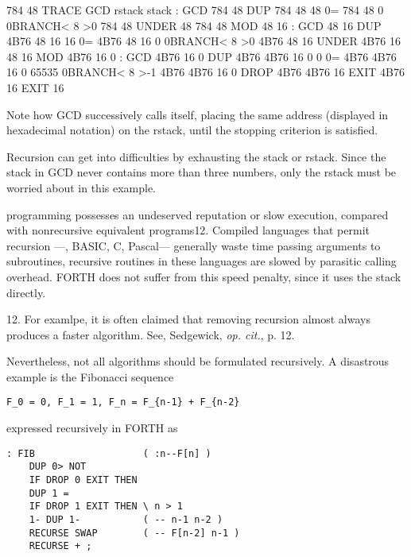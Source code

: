 784 48 TRACE GCD
                            rstack      stack
: GCD                                   784 48
    DUP                                 784 48  48
    0=                                  784 48   0
    0BRANCH< 8 >0                       784 48
    UNDER                               48  784 48
    MOD                                 48  16
    : GCD                               48  16
      DUP                   4B76        48  16  16
      0=                    4B76        48  16   0
      0BRANCH< 8 >0         4B76        48  16
      UNDER                 4B76        16  48  16
        MOD                 4B76        16   0
        : GCD               4B76        16   0
          DUP               4B76 4B76   16   0   0
          0=                4B76 4B76   16   0  65535
          0BRANCH< 8 >-1    4B76 4B76   16   0
          DROP              4B76 4B76   16
        EXIT                4B76        16
    EXIT                                16

Note how GCD successively calls itself, placing the same address (displayed in hexadecimal notation) on the rstack, until the stopping criterion is satisfied.

Recursion can get into difficulties by exhausting the stack or rstack. Since the stack in GCD never contains more than three numbers, only the rstack must be worried about in this example.

 programming possesses an undeserved reputation or slow execution, compared with nonrecursive equivalent programs12. Compiled languages that permit recursion —\eg, BASIC, C, Pascal— generally waste time passing arguments to subroutines, \ie recursive routines in these languages are slowed by parasitic calling overhead. FORTH does not suffer from this speed penalty, since it uses the stack directly.

12. For examlpe, it is often claimed that removing recursion almost always produces a faster algorithm. See, \eg Sedgewick, \textit{op. cit.}, p. 12.

Nevertheless, not all algorithms should be formulated recursively. A disastrous example is the Fibonacci sequence

\begin{lstlisting}
F_0 = 0, F_1 = 1, F_n = F_{n-1} + F_{n-2}
\end{lstlisting}

expressed recursively in FORTH as
\begin{lstlisting}
: FIB                   ( :n--F[n] )
    DUP 0> NOT
    IF DROP 0 EXIT THEN
    DUP 1 = 
    IF DROP 1 EXIT THEN \ n > 1
    1- DUP 1-           ( -- n-1 n-2 )
    RECURSE SWAP        ( -- F[n-2] n-1 )
    RECURSE + ;
\end{lstlisting}

